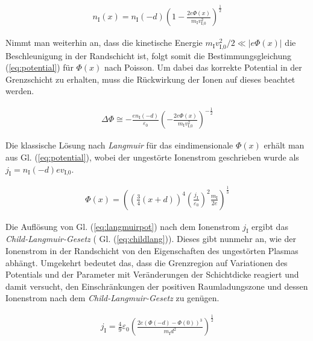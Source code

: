 \documentclass[numbers=noenddot,a4paper]{scrartcl}
\newcommand{\ix}[1]{_\text{#1}}
\newcommand{\tilt}[1]{\textit{#1}}
\begin{document}
			\begin{align}
				n\ix{I}\left(x\right)=n\ix{I}\left(-d\right)\left(1-\frac{2e\Phi\left(x\right)}{m\ix{I}v\ix{I,0}^2}\right)^{\frac{1}{2}}
			\end{align}

		Nimmt man weiterhin an, dass die kinetische Energie $m\ix{I}v\ix{I,0}^2/2\ll |e\Phi\left(x\right)|$ die Beschleunigung in der Randschicht ist, folgt somit die Bestimmungsgleichung (\ref{eq:potential}) für $\Phi\left(x\right)$ nach Poisson. Um dabei das korrekte Potential in der Grenzschicht zu erhalten, muss die Rückwirkung der Ionen auf dieses beachtet werden.

			\begin{align}
				\Delta\Phi\cong-\frac{en\ix{I}\left(-d\right)}{\varepsilon\ix{0}}\left(-\frac{2e\Phi\left(x\right)}{m\ix{I}v\ix{I,0}^2}\right)^{-\frac{1}{2}} \label{eq:potential}
			\end{align}

		Die klassische Lösung nach \tilt{Langmuir} für das eindimensionale $\Phi\left(x\right)$ erhält man aus Gl. (\ref{eq:potential}), wobei der ungestörte Ionenstrom geschrieben wurde als $j\ix{I}=n\ix{I}\left(-d\right)ev\ix{I,0}$.

			\begin{align}
				\Phi\left(x\right)=\left(\left(\frac{3}{4}\left(x+d\right)\right)^4\left(\frac{j\ix{I}}{\varepsilon\ix{0}}\right)^2\frac{m\ix{I}}{2e}\right)^{\frac{1}{3}}  \label{eq:langmuirpot}
			\end{align}

		Die Auflösung von Gl. (\ref{eq:langmuirpot}) nach dem Ionenstrom $j\ix{I}$ ergibt das \tilt{Child-Langmuir-Gesetz} ( Gl. (\ref{eq:childlang})). Dieses gibt nunmehr an, wie der Ionenstrom in der Randschicht von den Eigenschaften des ungestörten Plasmas abhängt. Umgekehrt bedeutet das, dass die Grenzregion auf Variationen des Potentials und der Parameter mit Veränderungen der Schichtdicke reagiert und damit versucht, den Einschränkungen der positiven Raumladungszone und dessen Ionenstrom nach dem \tilt{Child-Langmuir-Gesetz} zu genügen.

			\begin{align}
				j\ix{I}=\frac{4}{9}\varepsilon\ix{0}\left(\frac{2e\left(\Phi\left(-d\right)-\Phi\left(0\right)\right)^3}{m\ix{I}d^2}\right)^{\frac{1}{2}} \label{eq:childlang}
			\end{align}
\end{document}
